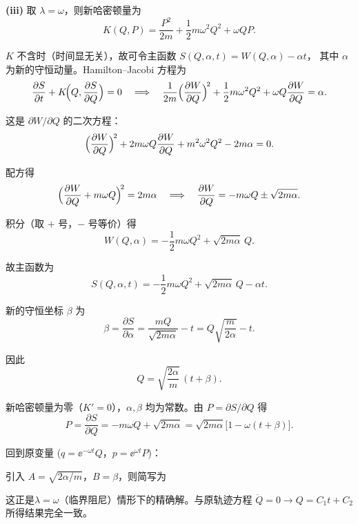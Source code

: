 \begin{question}[阻尼振子]
\begin{solution}
\textbf{(iii)} 取 $\lambda=\omega$，则新哈密顿量为
\[
K(Q,P)=\frac{P^{2}}{2m}+\frac12 m\omega^{2}Q^{2}+\omega QP.
\]

$K$ 不含时（时间显无关），故可令主函数 $S(Q,\alpha,t)=W(Q,\alpha)-\alpha t$，
其中 $\alpha$ 为新的守恒动量。Hamilton--Jacobi 方程为
\[
\frac{\partial S}{\partial t}+K\!\Bigl(Q,\frac{\partial S}{\partial Q}\Bigr)=0
\quad\Longrightarrow\quad
\frac{1}{2m}\Bigl(\frac{\partial W}{\partial Q}\Bigr)^{\!2}
+\frac12 m\omega^{2}Q^{2}+\omega Q\frac{\partial W}{\partial Q}
=\alpha.
\]

这是 $\partial W/\partial Q$ 的二次方程：
\[
\Bigl(\frac{\partial W}{\partial Q}\Bigr)^{\!2}
+2m\omega Q\frac{\partial W}{\partial Q}
+m^{2}\omega^{2}Q^{2}-2m\alpha=0.
\]

配方得
\[
\Bigl(\frac{\partial W}{\partial Q}+m\omega Q\Bigr)^{\!2}=2m\alpha
\quad\Longrightarrow\quad
\frac{\partial W}{\partial Q}=-m\omega Q\pm\sqrt{2m\alpha}.
\]

积分（取 $+$ 号，$-$ 号等价）得
\[
W(Q,\alpha)=-\frac12 m\omega Q^{2}+\sqrt{2m\alpha}\,Q.
\]

故主函数为
\[
S(Q,\alpha,t)=-\frac12 m\omega Q^{2}+\sqrt{2m\alpha}\,Q-\alpha t.
\]

新的守恒坐标 $\beta$ 为
\[
\beta=\frac{\partial S}{\partial\alpha}
=\frac{mQ}{\sqrt{2m\alpha}}-t
=Q\sqrt{\frac{m}{2\alpha}}-t.
\]

因此
\[
Q=\sqrt{\frac{2\alpha}{m}}\,(t+\beta).
\]

新哈密顿量为零（$K'=0$），$\alpha,\beta$ 均为常数。由 $P=\partial S/\partial Q$ 得
\[
P=\frac{\partial S}{\partial Q}=-m\omega Q+\sqrt{2m\alpha}
=\sqrt{2m\alpha}\bigl[1-\omega(t+\beta)\bigr].
\]

回到原变量 ($q=\ee^{-\omega t}Q$，$p=\ee^{\omega t}P$)：


引入 $A=\sqrt{2\alpha/m}$，$B=\beta$，则简写为


这正是$\lambda=\omega$（临界阻尼）情形下的精确解。与原轨迹方程
$\ddot Q=0\to Q=C_{1}t+C_{2}$ 所得结果完全一致。

\end{solution}
\end{question}


